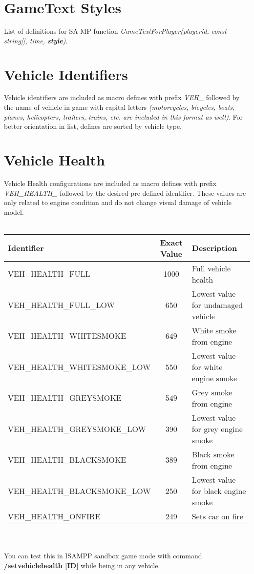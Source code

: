 \documentclass{article}
\begin{document}
\section{GameText Styles}
List of definitions for SA-MP function \textit{GameTextForPlayer(playerid, const string[], time, \textbf{style})}.

\section{Vehicle Identifiers}
Vehicle identifiers are included as macro defines with prefix \textit{VEH\_} followed by the name of vehicle in game with capital letters \textit{(motorcycles, bicycles, boats, planes, helicopters, trailers, trains, etc. are included in this format as well)}. For better orientation in list, defines are sorted by vehicle type.

\section{Vehicle Health}
Vehicle Health configurations are included as macro defines with prefix \textit{VEH\_HEALTH\_} followed by the desired pre-defined identifier. These values are only related to engine condition and do not change visual damage of vehicle model.
\\
\\
\begin{tabular}{ |l|c|l| } 
\hline
Identifier & Exact Value & Description \\
\hline
VEH\_HEALTH\_FULL & 1000 & Full vehicle health \\ 
VEH\_HEALTH\_FULL\_LOW & 650 &  Lowest value for undamaged vehicle \\ 
VEH\_HEALTH\_WHITESMOKE & 649 & White smoke from engine \\ 
VEH\_HEALTH\_WHITESMOKE\_LOW & 550 & Lowest value for white engine smoke \\ 
VEH\_HEALTH\_GREYSMOKE & 549 & Grey smoke from engine \\ 
VEH\_HEALTH\_GREYSMOKE\_LOW & 390 & Lowest value for grey engine smoke\\ 
VEH\_HEALTH\_BLACKSMOKE & 389 & Black smoke from engine \\ 
VEH\_HEALTH\_BLACKSMOKE\_LOW & 250 & Lowest value for black engine smoke \\ 
VEH\_HEALTH\_ONFIRE & 249 & Sets car on fire \\
\hline
\end{tabular}
\\
\\
You can test this in ISAMPP sandbox game mode with command \textbf{/setvehiclehealth [ID]} while being in any vehicle.
\end{document}
